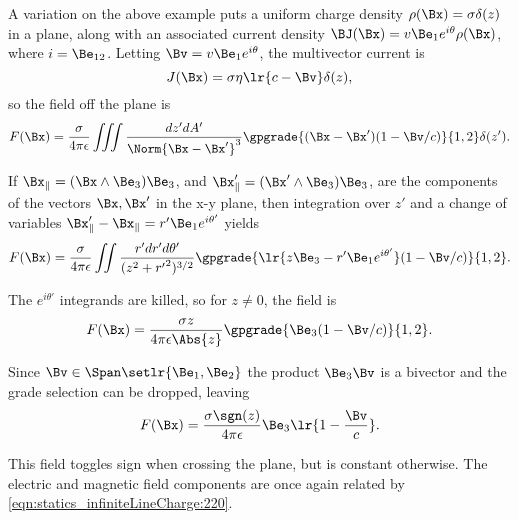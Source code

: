 %
%
A variation on the above example puts a uniform charge density \( \rho(\Bx) = \sigma \delta(z) \) in a plane, along with an associated current density \( \BJ(\Bx) = v \Be_1 e^{i\theta} \rho(\Bx) \), where \( i = \Be_{12} \).  Letting \( \Bv = v \Be_1 e^{i\theta} \), the multivector current is
\begin{equation}\label{eqn:statics_infinitePlane:240}
J(\Bx) = \sigma \eta \lr{ c - \Bv } \delta(z),
\end{equation}
so the field off the plane is
\begin{equation}\label{eqn:statics_infinitePlane:260}
F(\Bx) = \frac{\sigma}{4 \pi \epsilon } \iiint \frac{dz' dA'}{ \Norm{ \Bx - \Bx' }^3 } \gpgrade{ (\Bx - \Bx') (1 - \Bv/c) }{1,2} \delta(z').
\end{equation}

If \( \Bx_\parallel = (\Bx \wedge \Be_3) \Be_3 \), and \( \Bx'_\parallel = (\Bx' \wedge \Be_3) \Be_3 \), are the components of the vectors \( \Bx, \Bx' \) in the x-y plane, then integration over \( z' \) and a change of variables \( \Bx'_\parallel - \Bx_\parallel = r' \Be_1 e^{i \theta'} \) yields
\begin{equation}\label{eqn:statics_infinitePlane:280}
F(\Bx) = \frac{\sigma}{4 \pi \epsilon } \iint \frac{r' dr' d\theta'}{ ( z^2 + {r'}^2 )^{3/2} } \gpgrade{ \lr{ z \Be_3 - r' \Be_1 e^{i\theta'} } (1 - \Bv/c) }{1,2}.
\end{equation}

The \( e^{i\theta'} \) integrands are killed, so for \( z \ne 0 \), the field is
\begin{equation}\label{eqn:statics_infinitePlane:300}
F(\Bx) = \frac{\sigma z}{4 \pi \epsilon \Abs{z} } \gpgrade{ \Be_3 (1 - \Bv/c) }{1,2}.
\end{equation}

Since \( \Bv \in \Span \setlr{ \Be_1, \Be_2 } \) the product \( \Be_3 \Bv \) is a bivector and the grade selection can be dropped, leaving
\begin{equation}\label{eqn:statics_infinitePlane:320}
F(\Bx) = \frac{\sigma \sgn(z)}{4 \pi \epsilon } \Be_3 \lr{ 1 - \frac{\Bv}{c}}.
\end{equation}

This field toggles sign when crossing the plane, but is constant otherwise.  The electric and magnetic field components are once again related by \cref{eqn:statics_infiniteLineCharge:220}.


